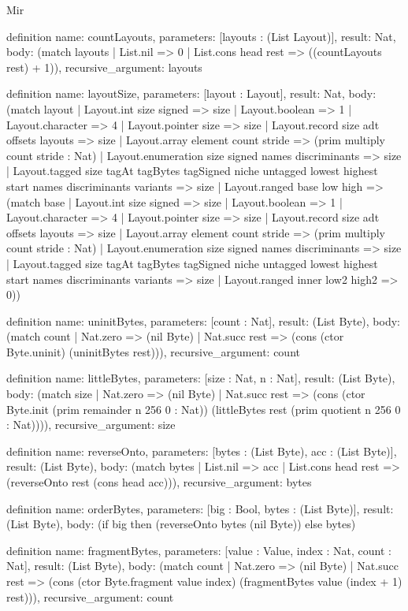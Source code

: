 \begin{lexlean}{Mir}
\begin{semanticmodule}
definition{
  name: countLayouts,
  parameters: [layouts : (List Layout)],
  result: Nat,
  body: (match layouts | List.nil => 0 | List.cons head rest => ((countLayouts rest) + 1)),
  recursive_argument: layouts
}

definition{
  name: layoutSize,
  parameters: [layout : Layout],
  result: Nat,
  body: (match layout
    | Layout.int size signed => size
    | Layout.boolean => 1
    | Layout.character => 4
    | Layout.pointer size => size
    | Layout.record size adt offsets layouts => size
    | Layout.array element count stride => (prim multiply count stride : Nat)
    | Layout.enumeration size signed names discriminants => size
    | Layout.tagged size tagAt tagBytes tagSigned niche untagged lowest highest start names discriminants variants => size
    | Layout.ranged base low high => (match base
      | Layout.int size signed => size
      | Layout.boolean => 1
      | Layout.character => 4
      | Layout.pointer size => size
      | Layout.record size adt offsets layouts => size
      | Layout.array element count stride => (prim multiply count stride : Nat)
      | Layout.enumeration size signed names discriminants => size
      | Layout.tagged size tagAt tagBytes tagSigned niche untagged lowest highest start names discriminants variants => size
      | Layout.ranged inner low2 high2 => 0))
}

definition{
  name: uninitBytes,
  parameters: [count : Nat],
  result: (List Byte),
  body: (match count
    | Nat.zero => (nil Byte)
    | Nat.succ rest => (cons (ctor Byte.uninit) (uninitBytes rest))),
  recursive_argument: count
}

definition{
  name: littleBytes,
  parameters: [size : Nat, n : Nat],
  result: (List Byte),
  body: (match size
    | Nat.zero => (nil Byte)
    | Nat.succ rest => (cons (ctor Byte.init (prim remainder n 256 0 : Nat)) (littleBytes rest (prim quotient n 256 0 : Nat)))),
  recursive_argument: size
}

definition{
  name: reverseOnto,
  parameters: [bytes : (List Byte), acc : (List Byte)],
  result: (List Byte),
  body: (match bytes | List.nil => acc | List.cons head rest => (reverseOnto rest (cons head acc))),
  recursive_argument: bytes
}

definition{
  name: orderBytes,
  parameters: [big : Bool, bytes : (List Byte)],
  result: (List Byte),
  body: (if big then (reverseOnto bytes (nil Byte)) else bytes)
}

definition{
  name: fragmentBytes,
  parameters: [value : Value, index : Nat, count : Nat],
  result: (List Byte),
  body: (match count
    | Nat.zero => (nil Byte)
    | Nat.succ rest => (cons (ctor Byte.fragment value index) (fragmentBytes value (index + 1) rest))),
  recursive_argument: count
}


\end{semanticmodule}
\end{lexlean}
